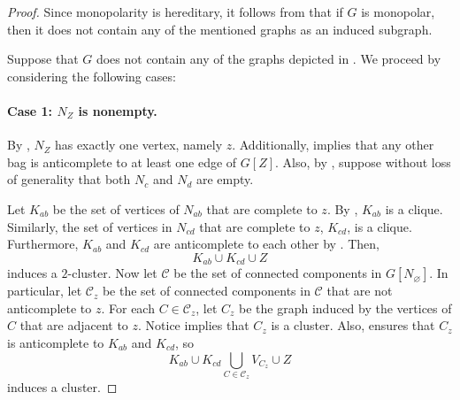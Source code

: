 \begin{proof}
    Since monopolarity is hereditary, it follows from
     that if $G$ is monopolar, then it does not
    contain any of the mentioned graphs as an induced subgraph.

    Suppose that $G$ does not contain any of the graphs depicted in
    . We proceed by considering the
    following cases:

    \paragraph{Case 1: $N_Z$ is nonempty.} By , $N_Z$
    has exactly one vertex, namely $z$. Additionally, 
    implies that any other bag is anticomplete to at least one edge of $G[Z]$.
    Also, by , suppose without loss of generality that
    both $N_c$ and $N_d$ are empty.

    Let $K_{ab}$ be the set of vertices of $N_{ab}$ that are complete to $z$. By
    , $K_{ab}$ is a clique. Similarly, the set
    of vertices in $N_{cd}$ that are complete to $z$, $K_{cd}$, is a clique.
    Furthermore, $K_{ab}$ and $K_{cd}$ are anticomplete to each other by
    . Then,
    \[
        K_{ab}\cup K_{cd} \cup Z
    \]
    induces a $2$-cluster. Now let $\mathcal{C}$ be the set of connected
    components in $G[N_\varnothing]$. In particular, let $\mathcal{C}_z$ be the
    set of connected components in $\mathcal{C}$ that are not anticomplete to
    $z$. For each $C\in \mathcal{C}_z$, let $C_z$ be the graph induced by the
    vertices of $C$ that are adjacent to $z$. Notice
     implies that $C_z$ is a cluster. Also,
     ensures that $C_z$ is anticomplete to $K_{ab}$
    and $K_{cd}$, so
    \[
        K_{ab} \cup K_{cd} \bigcup_{C\in \mathcal{C}_z} V_{C_z} \cup Z
    \]
    induces a cluster.
    

\end{proof}
